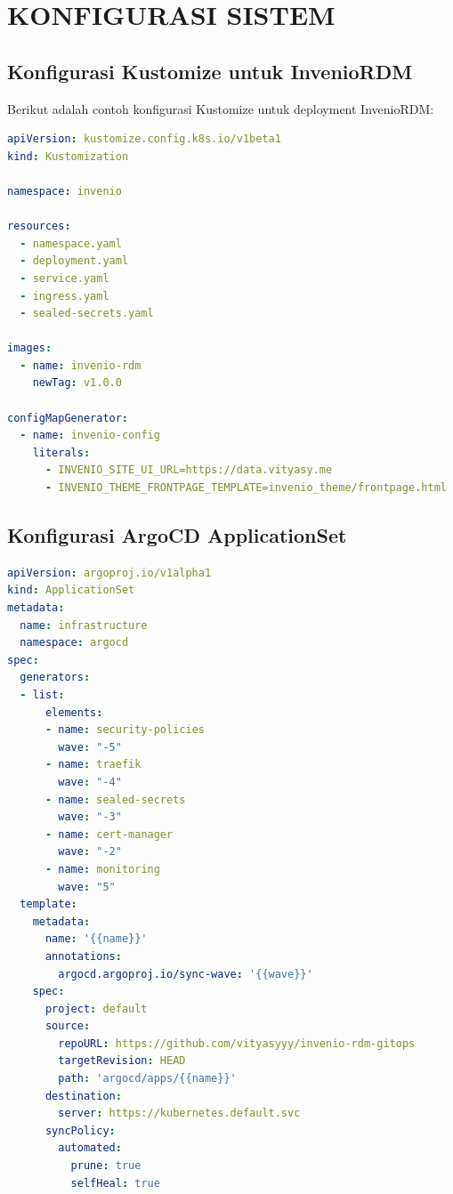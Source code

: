 \chapter{KONFIGURASI SISTEM}

\section{Konfigurasi Kustomize untuk InvenioRDM}

Berikut adalah contoh konfigurasi Kustomize untuk deployment InvenioRDM:

\begin{lstlisting}[language=yaml, caption={kustomization.yaml}]
apiVersion: kustomize.config.k8s.io/v1beta1
kind: Kustomization

namespace: invenio

resources:
  - namespace.yaml
  - deployment.yaml
  - service.yaml
  - ingress.yaml
  - sealed-secrets.yaml

images:
  - name: invenio-rdm
    newTag: v1.0.0

configMapGenerator:
  - name: invenio-config
    literals:
      - INVENIO_SITE_UI_URL=https://data.vityasy.me
      - INVENIO_THEME_FRONTPAGE_TEMPLATE=invenio_theme/frontpage.html
\end{lstlisting}

\section{Konfigurasi ArgoCD ApplicationSet}

\begin{lstlisting}[language=yaml, caption={applicationset.yaml}]
apiVersion: argoproj.io/v1alpha1
kind: ApplicationSet
metadata:
  name: infrastructure
  namespace: argocd
spec:
  generators:
  - list:
      elements:
      - name: security-policies
        wave: "-5"
      - name: traefik
        wave: "-4"
      - name: sealed-secrets
        wave: "-3"
      - name: cert-manager
        wave: "-2"
      - name: monitoring
        wave: "5"
  template:
    metadata:
      name: '{{name}}'
      annotations:
        argocd.argoproj.io/sync-wave: '{{wave}}'
    spec:
      project: default
      source:
        repoURL: https://github.com/vityasyyy/invenio-rdm-gitops
        targetRevision: HEAD
        path: 'argocd/apps/{{name}}'
      destination:
        server: https://kubernetes.default.svc
      syncPolicy:
        automated:
          prune: true
          selfHeal: true
\end{lstlisting}

